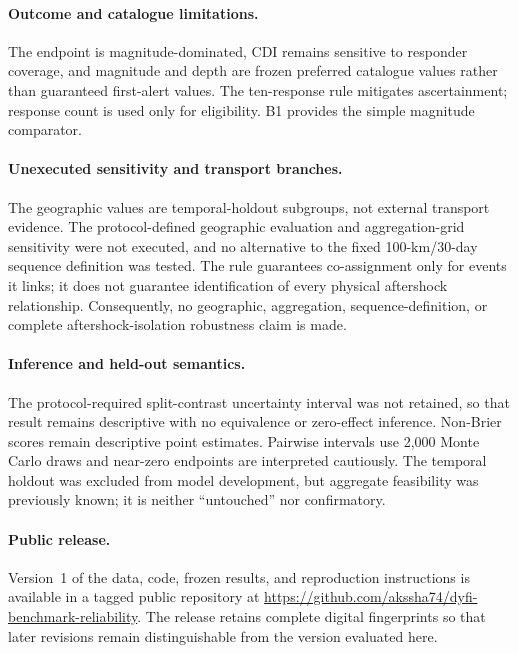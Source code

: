 \documentclass[pdflatex,sn-basic,iicol]{sn-jnl}
\begin{document}
\paragraph{Outcome and catalogue limitations.} The endpoint is
magnitude-dominated, CDI remains sensitive to responder coverage, and magnitude
and depth are frozen preferred catalogue values rather than guaranteed
first-alert values. The ten-response rule mitigates ascertainment; response
count is used only for eligibility. B1 provides the simple magnitude comparator.

\paragraph{Unexecuted sensitivity and transport branches.} The geographic
values are temporal-holdout subgroups, not external transport evidence. The
protocol-defined geographic evaluation and aggregation-grid sensitivity were not
executed, and no alternative to the fixed 100-km/30-day sequence definition was
tested. The rule guarantees co-assignment only for events it links; it does not
guarantee identification of every physical aftershock relationship.
Consequently, no geographic, aggregation, sequence-definition, or complete
aftershock-isolation robustness claim is made.

\paragraph{Inference and held-out semantics.} The protocol-required split-contrast
uncertainty interval was not retained, so that result remains descriptive with
no equivalence or zero-effect inference. Non-Brier scores remain descriptive
point estimates. Pairwise intervals use 2{,}000 Monte
Carlo draws and near-zero endpoints are interpreted cautiously. The temporal
holdout was excluded from model development, but aggregate feasibility was
previously known; it is neither ``untouched'' nor confirmatory.

\paragraph{Public release.} Version~1 of the data, code, frozen results, and
reproduction instructions is available in a tagged public repository at
\url{https://github.com/akssha74/dyfi-benchmark-reliability}. The release retains
complete digital fingerprints so that later revisions remain distinguishable
from the version evaluated here.
\end{document}
